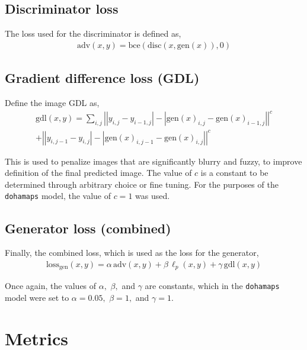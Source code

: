 \documentclass{article}
\begin{document}
\subsection{Discriminator loss}

The loss used for the discriminator is defined as,
\begin{align*}
    \mathrm{adv}(x, y) =
    \mathrm{bce}(\mathrm{disc}(x, \mathrm{gen}(x)), 0)
\end{align*}

\subsection{Gradient difference loss (GDL)}

Define the image GDL \cite{multiscale} as,
\begin{align*}
    \mathrm{gdl}(x, y) = \sum_{i, j}\left||y_{i, j} - y_{i - 1, j}| -
    |\mathrm{gen}(x)_{i, j} - \mathrm{gen}(x)_{i - 1, j}|\right|^c\\
    + \left||y_{i, j - 1} - y_{i, j}| -
    |\mathrm{gen}(x)_{i, j - 1} - \mathrm{gen}(x)_{i, j}|\right|^c
\end{align*}

This is used to penalize images that are significantly blurry and fuzzy, to improve definition of the final predicted image. The value of $c$ is a constant to be determined through arbitrary choice or fine tuning. For the purposes of the \texttt{dohamaps} model, the value of $c = 1$ was used.

\subsection{Generator loss (combined)}

Finally, the combined loss, which is used as the loss for the generator,
\begin{align*}
    \mathrm{loss}_{\mathrm{gen}}(x, y) = \alpha\, \mathrm{adv}(x, y) +
    \beta\, \mathrm{\ell}_p(x, y) + \gamma\, \mathrm{gdl}(x, y)
\end{align*}

Once again, the values of $\alpha,$ $\beta,$ and $\gamma$ are constants, which in the \texttt{dohamaps} model were set to $\alpha = 0.05,$ $\beta = 1,$ and $\gamma = 1$.

\clearpage

\section{Metrics}
\end{document}
